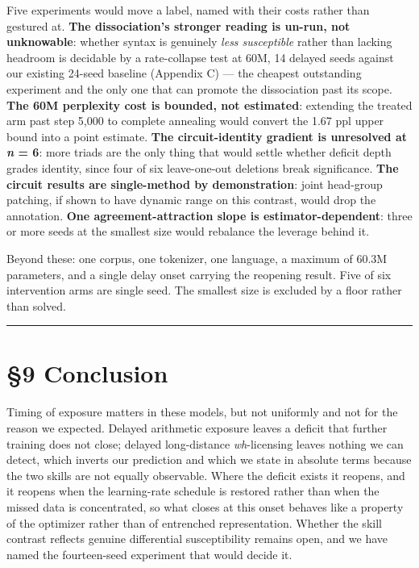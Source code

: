 \documentclass[11pt]{article}
\begin{document}
Five experiments would move a label, named with their costs rather than gestured at.
\textbf{The dissociation's stronger reading is un-run, not unknowable}: whether syntax is genuinely
\emph{less susceptible} rather than lacking headroom is decidable by a rate-collapse test at 60M,
14 delayed seeds against our existing 24-seed baseline (Appendix C) — the cheapest
outstanding experiment and the only one that can promote the dissociation past its scope.
\textbf{The 60M perplexity cost is bounded, not estimated}: extending the treated arm past step
5,000 to complete annealing would convert the 1.67 ppl upper bound into a point estimate.
\textbf{The circuit-identity gradient is unresolved at \emph{n} = 6}: more triads are the only thing that
would settle whether deficit depth grades identity, since four of six leave-one-out
deletions break significance. \textbf{The circuit results are single-method by demonstration}:
joint head-group patching, if shown to have dynamic range on this contrast, would drop the
annotation. \textbf{One agreement-attraction slope is estimator-dependent}: three or more seeds at
the smallest size would rebalance the leverage behind it.

Beyond these: one corpus, one tokenizer, one language, a maximum of 60.3M parameters, and a
single delay onset carrying the reopening result. Five of six intervention arms are single
seed. The smallest size is excluded by a floor rather than solved.

\begin{center}\rule{0.5\linewidth}{0.5pt}\end{center}

\section{§9 Conclusion}\label{conclusion}

Timing of exposure matters in these models, but not uniformly and not for the reason we
expected. Delayed arithmetic exposure leaves a deficit that further training does not close;
delayed long-distance \emph{wh}-licensing leaves nothing we can detect, which inverts our
prediction and which we state in absolute terms because the two skills are not equally
observable. Where the deficit exists it reopens, and it reopens when the learning-rate
schedule is restored rather than when the missed data is concentrated, so what closes at
this onset behaves like a property of the optimizer rather than of entrenched representation.
Whether the skill contrast reflects genuine differential susceptibility remains open, and we
have named the fourteen-seed experiment that would decide it.
\end{document}
